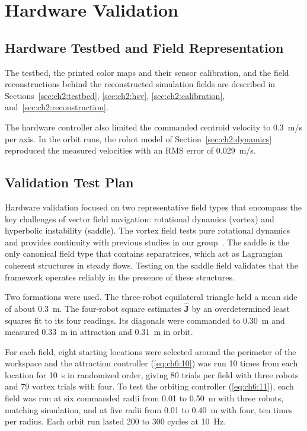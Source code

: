 \section{Hardware Validation}
\label{sec:ch6:hw}

\subsection{Hardware Testbed and Field Representation}
\label{sec:ch6:hw_testbed}

The testbed, the printed color maps and their sensor calibration, and the
field reconstructions behind the reconstructed simulation fields are
described in Sections~\ref{sec:ch2:testbed}, \ref{sec:ch2:hsv},
\ref{sec:ch2:calibration}, and~\ref{sec:ch2:reconstruction}.

The hardware controller also limited the commanded centroid velocity to 0.3~m/s per axis. In the orbit runs, the robot model of Section~\ref{sec:ch2:dynamics} reproduced the measured velocities with an RMS error of 0.029~m/s.

\subsection{Validation Test Plan}
\label{sec:ch6:hw_plan}

Hardware validation focused on two representative field types that encompass the key challenges of vector field navigation: rotational dynamics (vortex) and hyperbolic instability (saddle). The vortex field tests pure rotational dynamics and provides continuity with previous studies in our group~\cite{30,26}. The saddle is the only canonical field type that contains separatrices, which act as Lagrangian coherent structures in steady flows. Testing on the saddle field validates that the framework operates reliably in the presence of these structures.

Two formations were used. The three-robot equilateral triangle held a mean side of about 0.3~m. The four-robot square estimates $\hat{\mathbf{J}}$ by an overdetermined least squares fit to its four readings. Its diagonals were commanded to 0.30~m and measured 0.33~m in attraction and 0.31~m in orbit.

For each field, eight starting locations were selected around the perimeter of the workspace and the attraction controller (\ref{eq:ch6:10}) was run 10 times from each location for 10~s in randomized order, giving 80 trials per field with three robots and 79 vortex trials with four. To test the orbiting controller (\ref{eq:ch6:11}), each field was run at six commanded radii from 0.01 to 0.50~m with three robots, matching simulation, and at five radii from 0.01 to 0.40~m with four, ten times per radius. Each orbit run lasted 200 to 300 cycles at 10~Hz.

